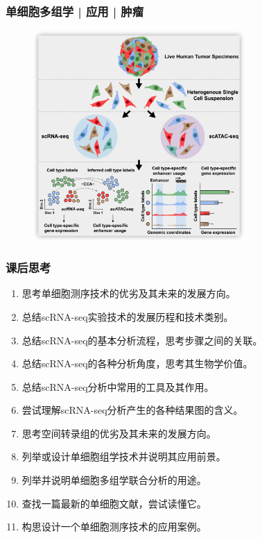 \documentclass[11pt]{ctexbeamer}
\begin{document}
\begin{frame}
	\frametitle{单细胞多组学 | 应用 | 肿瘤}
	\begin{figure}
		\includegraphics[width=0.72\textwidth]{omics_example_03.png}
	\end{figure}
\end{frame}



\begin{frame}[label=current]
	\frametitle{课后思考}
	\begin{enumerate}
		\item 思考单细胞测序技术的优劣及其未来的发展方向。
		\item 总结scRNA-seq实验技术的发展历程和技术类别。
		\item 总结scRNA-seq的基本分析流程，思考步骤之间的关联。
		\item 总结scRNA-seq的各种分析角度，思考其生物学价值。
		\item 总结scRNA-seq分析中常用的工具及其作用。
		\item 尝试理解scRNA-seq分析产生的各种结果图的含义。
		\item 思考空间转录组的优劣及其未来的发展方向。
		\item 列举或设计单细胞组学技术并说明其应用前景。
		\item 列举并说明单细胞多组学联合分析的用途。
		\item 查找一篇最新的单细胞文献，尝试读懂它。
		\item 构思设计一个单细胞测序技术的应用案例。
	\end{enumerate}
\end{frame}
\end{document}
